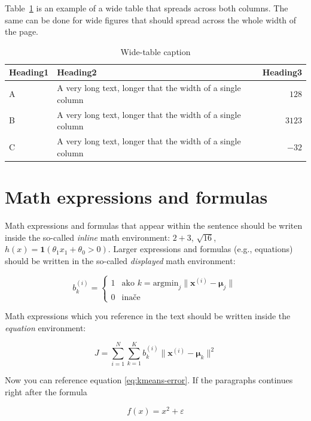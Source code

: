 \documentclass[10pt, a4paper]{article}
\begin{document}
Table~\ref{tab:wide-table} is an example of a wide table that spreads across both columns. The same can be done for wide figures that should spread across the whole width of the page. 

\begin{table}
\caption{Wide-table caption}
\label{tab:wide-table}
\begin{center}
\begin{tabular}{llr}
\toprule
Heading1 & Heading2 & Heading3\\
\midrule
A & A very long text, longer that the width of a single column & $128$\\
B & A very long text, longer that the width of a single column & $3123$\\
C & A very long text, longer that the width of a single column & $-32$\\
\bottomrule
\end{tabular}
\end{center}
\end{table}

\section{Math expressions and formulas}

Math expressions and formulas that appear within the sentence should be writen inside the so-called \emph{inline} math environment: $2+3$, $\sqrt{16}$, $h(x)=\mathbf{1}(\theta_1 x_1 + \theta_0>0)$. Larger expressions and formulas (e.g., equations) should be written in the so-called \emph{displayed} math environment:

\[
b^{(i)}_k = \begin{cases}
1 & \text{ako 
    $k = \text{argmin}_j \| \mathbf{x}^{(i)} - \mathbf{\mu}_j \|$}\\
0 & \text{inače}
\end{cases}
\]

Math expressions which you reference in the text should be written inside the \textit{equation} environment:

\begin{equation}\label{eq:kmeans-error}
J = \sum_{i=1}^N \sum_{k=1}^K 
b^{(i)}_k \| \mathbf{x}^{(i)} - \mathbf{\mu}_k \|^2
\end{equation}

Now you can reference equation \eqref{eq:kmeans-error}. If the paragraphs continues right after the formula

\begin{equation}
f(x) = x^2 + \varepsilon
\end{equation}
\end{document}
